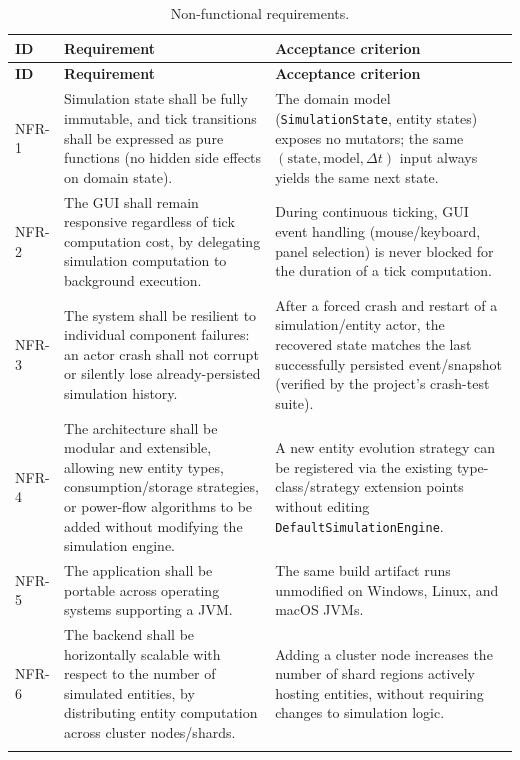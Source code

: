 \documentclass{scrreprt}
\begin{document}
  \begin{longtable}{@{}p{1.5cm} p{6.3cm} p{6.3cm}@{}}
  \toprule
  \textbf{ID} & \textbf{Requirement} & \textbf{Acceptance criterion} \\
  \midrule
  \endfirsthead
  \toprule
  \textbf{ID} & \textbf{Requirement} & \textbf{Acceptance criterion} \\
  \midrule
  \endhead
  \bottomrule
  \endfoot

  NFR-1 &
  Simulation state shall be fully immutable, and tick transitions shall be
  expressed as pure functions (no hidden side effects on domain state). &
  The domain model (\texttt{SimulationState}, entity states) exposes no
  mutators; the same $(\text{state}, \text{model}, \Delta t)$ input always
  yields the same next state. \\

  NFR-2 &
  The GUI shall remain responsive regardless of tick computation cost, by
  delegating simulation computation to background execution. &
  During continuous ticking, GUI event handling (mouse/keyboard, panel
  selection) is never blocked for the duration of a tick computation. \\

  NFR-3 &
  The system shall be resilient to individual component failures: an actor
  crash shall not corrupt or silently lose already-persisted simulation
  history. &
  After a forced crash and restart of a simulation/entity actor, the
  recovered
  state matches the last successfully persisted event/snapshot (verified by
  the project's crash-test suite). \\

  NFR-4 &
  The architecture shall be modular and extensible, allowing new entity
  types,
  consumption/storage strategies, or power-flow algorithms to be added
  without
  modifying the simulation engine. &
  A new entity evolution strategy can be registered via the existing
  type-class/strategy extension points without editing
  \texttt{DefaultSimulationEngine}. \\

  NFR-5 &
  The application shall be portable across operating systems supporting a
  JVM. &
  The same build artifact runs unmodified on Windows, Linux, and macOS JVMs.
   \\

  NFR-6 &
  The backend shall be horizontally scalable with respect to the number of
  simulated entities, by distributing entity computation across cluster
  nodes/shards. &
  Adding a cluster node increases the number of shard regions actively
  hosting
  entities, without requiring changes to simulation logic. \\

  \caption{Non-functional requirements.}
  \label{tab:non-functional-requirements}
  \end{longtable}
\end{document}
